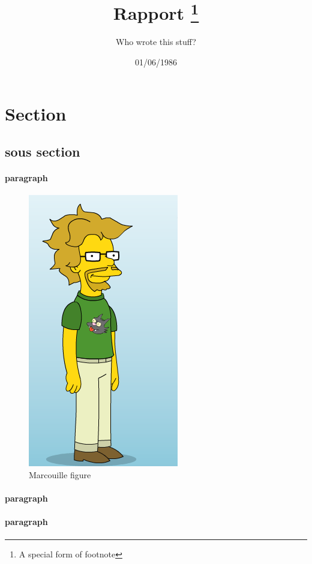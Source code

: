 \documentclass{article}
\title{Rapport
	\thanks{A special form of footnote}}
\author{Who wrote this stuff?}
\date{01/06/1986}
\begin{document}
\maketitle{}

\pagebreak



\listoffigures  %
\pagebreak
\listoftables   %
\pagebreak
\tableofcontents{}
\pagebreak

\section{Section}
\subsection{sous section}
\paragraph{paragraph}
\begin{figure}[htp]
\centering
\includegraphics{marcouille.png}
\caption{Marcouille figure}\label{fig:marcouille.png}
\end{figure}
\paragraph{paragraph}
\paragraph{paragraph}
\end{document}
